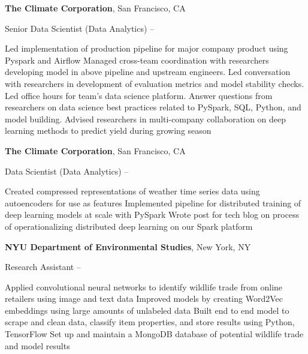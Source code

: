 \documentclass[letterpaper,9.5pt,oneside]{article}
\begin{document}
\begin{body}
\BigGap


\textbf{The Climate Corporation},
San Francisco, CA

\GapNoBreak
Senior Data Scientist (Data Analytics)
\hfill
{} --
\begin{detail}
\BulletItem Led implementation of production pipeline for major company product using Pyspark and Airflow
\BulletItem Managed cross-team coordination with researchers developing model in above pipeline and upstream engineers. Led conversation with researchers in development of evaluation metrics and model stability checks.
\BulletItem Led office hours for team's data science platform. Answer questions from researchers on data science best practices related to PySpark, SQL, Python, and model building.
\BulletItem Advised researchers in multi-company collaboration on deep learning methods to predict yield during growing season
\end{detail}

\BigGap


\textbf{The Climate Corporation},
San Francisco, CA

\GapNoBreak
Data Scientist (Data Analytics)
\hfill
{} --
\begin{detail}
\BulletItem Created compressed representations of weather time series data using autoencoders for use as features
\BulletItem Implemented pipeline for distributed training of deep learning models at scale with PySpark
\BulletItem Wrote post for tech blog on process of operationalizing distributed deep learning on our Spark platform
\end{detail}

\BigGap

\textbf{NYU Department of Environmental Studies},
New York, NY

\GapNoBreak
Research Assistant
\hfill
{} --
\begin{detail}
\BulletItem Applied convolutional neural networks to identify wildlife trade from online retailers using image and text data
\BulletItem Improved models by creating Word2Vec embeddings using large amounts of unlabeled data
\BulletItem Built end to end model to scrape and clean data, classify item properties, and store results using Python, TensorFlow
\BulletItem Set up and maintain a MongoDB database of potential wildlife trade and model results
\end{detail}


\end{body}
\end{document}
